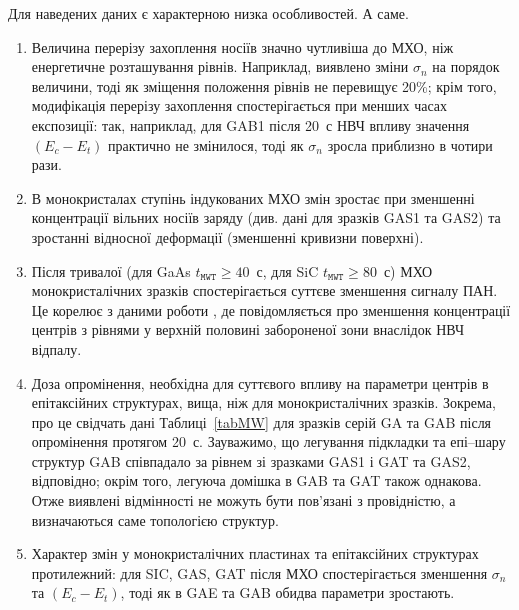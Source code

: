 Для наведених даних є характерною низка особливостей.
А саме.
\begin{enumerate}[label=\arabic*),leftmargin=0em,itemindent=1.5em]
\item Величина перерізу захоплення носіїв значно чутливіша до МХО, ніж енергетичне розташування рівнів.
Наприклад, виявлено зміни $\sigma_n$ на порядок величини, тоді як зміщення положення рівнів не перевищує 20\%;
крім того, модифікація перерізу захоплення спостерігається при менших часах експозиції: так, наприклад,
для GAB1 після 20~с НВЧ впливу значення $(E_c-E_t)$ практично не змінилося, тоді як $\sigma_n$ зросла приблизно в чотири рази.

\item В монокристалах ступінь індукованих МХО змін зростає при зменшенні концентрації вільних носіїв заряду (див. дані для зразків GAS1 та GAS2) та зростанні відносної деформації (зменшенні кривизни поверхні).

\item Після тривалої (для GaAs $t_\mathtt{MWT}\geq40$~с, для SiC $t_\mathtt{MWT}\geq80$~с) МХО монокристалічних
зразків спостерігається суттєве зменшення сигналу ПАН.
Це корелює з даними роботи \cite{Belyaev1998JTFr}, де повідомляється про зменшення концентрації центрів з
рівнями у верхній половині забороненої зони внаслідок НВЧ відпалу.

\item Доза опромінення, необхідна для суттєвого впливу на параметри центрів в епітаксійних структурах, вища, ніж
для монокристалічних зразків.
Зокрема, про це свідчать дані Таблиці~\ref{tabMW} для зразків серій GA та GAB після опромінення протягом 20~с.
Зауважимо, що легування підкладки та епі--шару структур GAB співпадало за рівнем зі зразками GAS1 і GAT та GAS2, відповідно; окрім того, легуюча домішка в GAB та GAT також однакова.
Отже виявлені відмінності не можуть бути пов'язані з провідністю, а визначаються саме топологією структур.

\item Характер змін у монокристалічних пластинах та епітаксійних структурах протилежний:
для SIC, GAS, GAT після МХО спостерігається зменшення $\sigma_n$ та $(E_c-E_t)$, тоді як в GAE та GAB обидва параметри зростають.
\end{enumerate}

